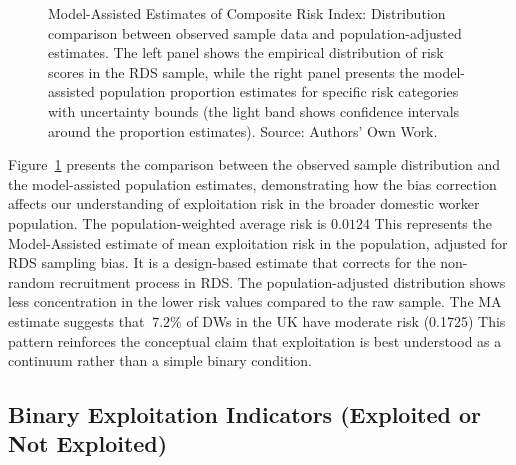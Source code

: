 \documentclass[
  12pt,
  letterpaper,
  DIV=11,
  numbers=noendperiod]{scrartcl}
\theoremstyle{plain}
\theoremstyle{definition}
\begin{document}
\begin{figure}[H]


\caption{\label{fig-ma-risk-estimates}Model-Assisted Estimates of
Composite Risk Index: Distribution comparison between observed sample
data and population-adjusted estimates. The left panel shows the
empirical distribution of risk scores in the RDS sample, while the right
panel presents the model-assisted population proportion estimates for
specific risk categories with uncertainty bounds (the light band shows
confidence intervals around the proportion estimates). Source: Authors'
Own Work.}

\end{figure}%

Figure~\ref{fig-ma-risk-estimates} presents the comparison between the
observed sample distribution and the model-assisted population
estimates, demonstrating how the bias correction affects our
understanding of exploitation risk in the broader domestic worker
population. The population-weighted average risk is \(0.0124\) This
represents the Model-Assisted estimate of mean exploitation risk in the
population, adjusted for RDS sampling bias. It is a design-based
estimate that corrects for the non-random recruitment process in RDS.
The population-adjusted distribution shows less concentration in the
lower risk values compared to the raw sample. The MA estimate suggests
that \(~7.2\%\) of DWs in the UK have moderate risk (0.1725) This
pattern reinforces the conceptual claim that exploitation is best
understood as a continuum rather than a simple binary condition.

\subsection{Binary Exploitation Indicators (Exploited or Not
Exploited)}\label{binary-exploitation-indicators-exploited-or-not-exploited}
\end{document}
